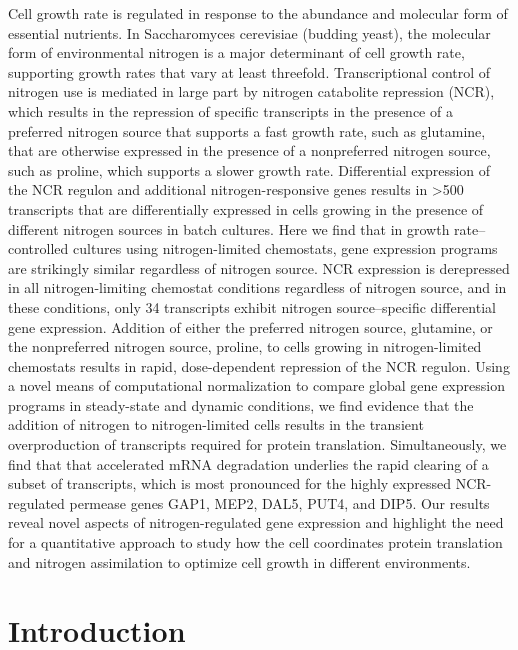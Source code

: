 Cell growth rate is
regulated in response to the abundance and molecular form of essential
nutrients. In Saccharomyces cerevisiae (budding yeast), the molecular
form of environmental nitrogen is a major determinant of cell growth
rate, supporting growth rates that vary at least threefold.
Transcriptional control of nitrogen use is mediated in large part by
nitrogen catabolite repression (NCR), which results in the repression
of specific transcripts in the presence of a preferred nitrogen source
that supports a fast growth rate, such as glutamine, that are
otherwise expressed in the presence of a nonpreferred nitrogen source,
such as proline, which supports a slower growth rate. Differential
expression of the NCR regulon and additional nitrogen-responsive genes
results in >500 transcripts that are differentially expressed in cells
growing in the presence of different nitrogen sources in batch
cultures. Here we find that in growth rate–controlled cultures using
nitrogen-limited chemostats, gene expression programs are strikingly
similar regardless of nitrogen source. NCR expression is derepressed
in all nitrogen-limiting chemostat conditions regardless of nitrogen
source, and in these conditions, only 34 transcripts exhibit nitrogen
source–specific differential gene expression. Addition of either the
preferred nitrogen source, glutamine, or the nonpreferred nitrogen
source, proline, to cells growing in nitrogen-limited chemostats
results in rapid, dose-dependent repression of the NCR regulon. Using
a novel means of computational normalization to compare global gene
expression programs in steady-state and dynamic conditions, we find
evidence that the addition of nitrogen to nitrogen-limited cells
results in the transient overproduction of transcripts required for
protein translation. Simultaneously, we find that that accelerated
mRNA degradation underlies the rapid clearing of a subset of
transcripts, which is most pronounced for the highly expressed
NCR-regulated permease genes GAP1, MEP2, DAL5, PUT4, and DIP5. Our
results reveal novel aspects of nitrogen-regulated gene expression and
highlight the need for a quantitative approach to study how the cell
coordinates protein translation and nitrogen assimilation to optimize
cell growth in different environments.  

\section{Introduction}

